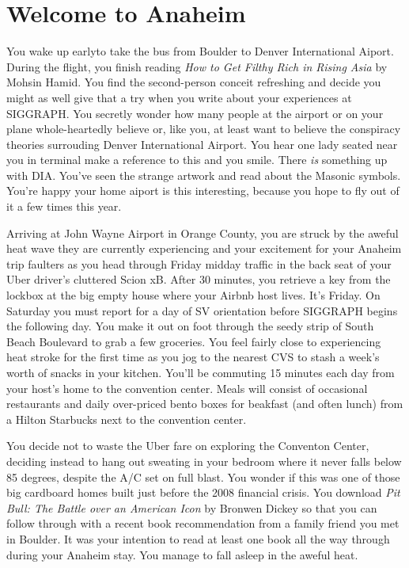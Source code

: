 \documentclass[../main.tex]{subfiles}
\begin{document}
\section{Welcome to Anaheim}

You wake up earlyto  take the bus from Boulder to Denver International Aiport. During the flight, you finish reading \textit{How to Get Filthy Rich in Rising Asia} by Mohsin Hamid. You find the second-person conceit refreshing and decide you might as well give that a try when you write about your experiences at SIGGRAPH. You secretly wonder how many people at the airport or on your plane whole-heartedly believe or, like you, at least want to believe the conspiracy theories surrouding Denver International Airport. You hear one lady seated near you in terminal make a reference to this and you smile. There \textit{is} something up with DIA. You've seen the strange artwork and read about the Masonic symbols. You're happy your home aiport is this interesting, because you hope to fly out of it a few times this year.

Arriving at John Wayne Airport in Orange County, you are struck by the aweful heat wave they are currently experiencing and your excitement for your Anaheim trip faulters as you head through Friday midday traffic in the back seat of your Uber driver's cluttered Scion xB. After 30 minutes, you retrieve a key from the lockbox at the big empty house where your Airbnb host lives. It's Friday. On Saturday you must report for a day of SV orientation before SIGGRAPH begins the following day. You make it out on foot through the seedy strip of South Beach Boulevard to grab a few groceries. You feel fairly close to experiencing heat stroke for the first time as you jog to the nearest CVS to stash a week's worth of snacks in your kitchen. You'll be commuting 15 minutes each day from your host's home to the convention center. Meals will consist of occasional restaurants and daily over-priced bento boxes for beakfast (and often lunch) from a Hilton Starbucks next to the convention center.

You decide not to waste the Uber fare on exploring the Conventon Center, deciding instead to hang out sweating in your bedroom where it never falls below 85 degrees, despite the A/C set on full blast. You wonder if this was one of those big cardboard homes built just before the 2008 financial crisis. You download \textit{Pit Bull: The Battle over an American Icon} by Bronwen Dickey so that you can follow through with a recent book recommendation from a family friend you met in Boulder. It was your intention to read at least one book all the way through during your Anaheim stay. You manage to fall asleep in the aweful heat.
 
\end{document}
